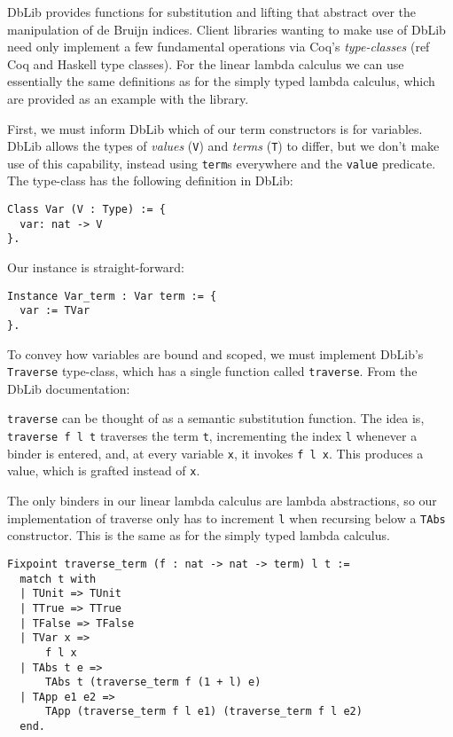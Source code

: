 \documentclass[]{unswthesis}
\let\c\texttt
\let\i\textit
\begin{document}
DbLib provides functions for substitution and lifting that abstract over the manipulation of de Bruijn indices. Client libraries wanting to make use of DbLib need only implement a few fundamental operations via Coq's \i{type-classes} (ref Coq and Haskell type classes). For the linear lambda calculus we can use essentially the same definitions as for the simply typed lambda calculus, which are provided as an example with the library.

First, we must inform DbLib which of our term constructors is for variables. DbLib allows the types of \i{values} (\c{V}) and \i{terms} (\c{T}) to differ, but we don't make use of this capability, instead using \c{term}s everywhere and the \c{value} predicate. The type-class has the following definition in DbLib:

\begin{verbatim}
Class Var (V : Type) := {
  var: nat -> V
}.
\end{verbatim}

Our instance is straight-forward:

\begin{verbatim}
Instance Var_term : Var term := {
  var := TVar
}.
\end{verbatim}


To convey how variables are bound and scoped, we must implement DbLib's \c{Traverse} type-class, which has a single function called \c{traverse}. From the DbLib documentation:

\begin{displayquote}
\c{traverse} can be thought of as a semantic substitution function. The idea is, \c{traverse f l t} traverses the term \c{t}, incrementing the index \c{l} whenever a binder is entered, and, at every variable \c{x}, it invokes \c{f l x}. This produces a value, which is grafted instead of \c{x}.
\end{displayquote}

The only binders in our linear lambda calculus are lambda abstractions, so our implementation of traverse only has to increment \c{l} when recursing below a \c{TAbs} constructor. This is the same as for the simply typed lambda calculus.

\begin{verbatim}
Fixpoint traverse_term (f : nat -> nat -> term) l t :=
  match t with
  | TUnit => TUnit
  | TTrue => TTrue
  | TFalse => TFalse
  | TVar x =>
      f l x
  | TAbs t e =>
      TAbs t (traverse_term f (1 + l) e)
  | TApp e1 e2 =>
      TApp (traverse_term f l e1) (traverse_term f l e2)
  end.
\end{verbatim}
\end{document}
